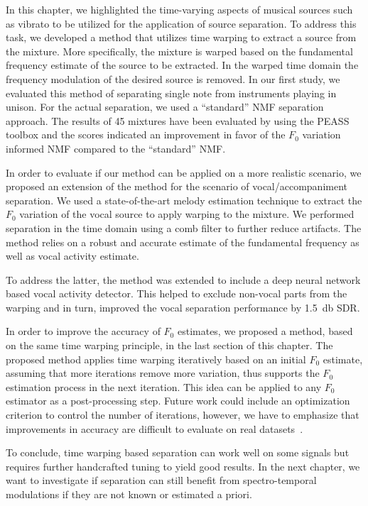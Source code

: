 In this chapter, we highlighted the time-varying aspects of musical sources such as vibrato to be utilized for the application of source separation.
To address this task, we developed a method that utilizes time warping to extract a source from the mixture.
More specifically, the mixture is warped based on the fundamental frequency estimate of the source to be extracted. 
In the warped time domain the frequency modulation of the desired source is removed. 
In our first study, we evaluated this method of separating single note from instruments playing in unison.
For the actual separation, we used a ``standard'' \acs{NMF} separation approach.
The results of 45 mixtures have been evaluated by using the PEASS toolbox and the scores indicated an improvement in favor of the $F_0$ variation informed \acs{NMF} compared to the ``standard'' \acs{NMF}.
\par
In order to evaluate if our method can be applied on a more realistic scenario, we proposed an extension of the method for the scenario of vocal/accompaniment separation.
We used a state-of-the-art melody estimation technique to extract the \(F_0\) variation of the vocal source to apply warping to the mixture.
We performed separation in the time domain using a comb filter to further reduce artifacts.
The method relies on a robust and accurate estimate of the fundamental frequency as well as vocal activity estimate.
\par
To address the latter, the method was extended to include a deep neural network based vocal activity detector.
This helped to exclude non-vocal parts from the warping and in turn, improved the vocal separation performance by 1.5~\si{\decibel} \acs{SDR}.
\par
In order to improve the accuracy of \(F_0\) estimates, we proposed a method, based on the same time warping principle, in the last section of this chapter. 
The proposed method applies time warping iteratively based on an initial \(F_0\) estimate, assuming that more iterations remove more variation, thus supports the \(F_0\) estimation process in the next iteration.
This idea can be applied to any \(F_0\) estimator as a post-processing step.
Future work could include an optimization criterion to control the number of iterations, however, we have to emphasize that improvements in accuracy are difficult to evaluate on real datasets~\cite{stoeter15acm}.
\par
To conclude, time warping based separation can work well on some signals but requires further handcrafted tuning to yield good results.
In the next chapter, we want to investigate if separation can still benefit from spectro-temporal modulations if they are not known or estimated a priori.